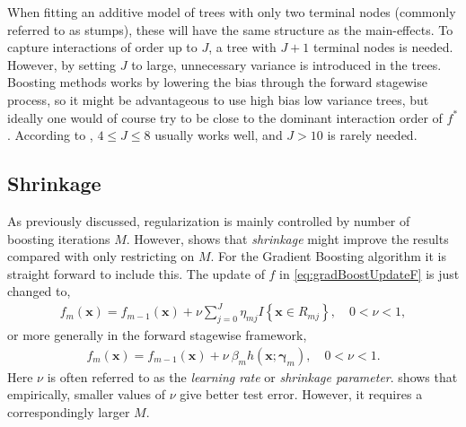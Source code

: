 When fitting an additive model of trees with only two terminal nodes (commonly referred to as stumps), these will have the same structure as the main-effects. To capture interactions of order up to $J$, a tree with $J+1$  terminal nodes is needed. However, by setting $J$ to large, unnecessary variance is introduced in the trees. Boosting methods works by lowering the bias through the forward stagewise process, so it might be advantageous to use high bias low variance trees, but ideally one would of course try to be close to the dominant interaction order of $f^*$.
According to \cite{modstat}, $4 \leq J \leq 8$ usually works well, and $J>10$ is rarely needed.  

\subsection{Shrinkage}
\label{sub:Shrinkage}
As previously discussed, regularization is mainly controlled by number of boosting iterations $M$. However, \cite{copas1983} shows that \textit{shrinkage} might improve the results compared with only restricting on $M$. For the Gradient Boosting algorithm it is straight forward to include this. 
The update of $f$ in \eqref{eq:gradBoostUpdateF} is just changed to,
\begin{align}
  f_m(\mathbf{x}) = f_{m-1}(\mathbf{x}) +  \nu \sum^{J}_{j=0} \eta_{m j} I\left\{ \mathbf{x} \in R_{m j} \right\}, \quad 0 < \nu < 1,
\end{align}
or more generally in the forward stagewise framework,
\begin{align}
  f_m(\mathbf{x}) = f_{m-1}(\mathbf{x}) +  \nu \: \beta_m h(\mathbf{x}; \bm \gamma_m), \quad 0 < \nu < 1.
\end{align}
Here $\nu$ is often referred to as the \textit{learning rate} or \textit{shrinkage parameter}. \cite{friedman} shows that empirically, smaller values of $\nu$ give better test error. However, it requires a correspondingly larger $M$. 


